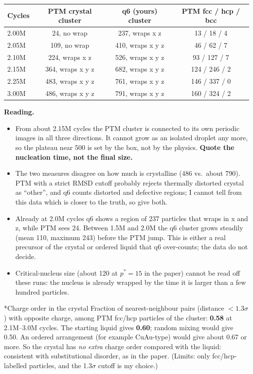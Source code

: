\documentclass[10.5pt,a4paper]{article}
\makeatletter
\renewcommand\subsection{\@startsection{subsection}{2}{0pt}{1.0em plus .2em minus .1em}{0.3em}{\large\bfseries\color{accent}}}
\newcommand{\ps}{p^{*}}
\makeatother
\begin{document}
\begin{center}\small
\begin{tabular}{@{}lccc@{}}
\toprule
Cycles & PTM crystal cluster & q6 (yours) cluster & PTM fcc / hcp / bcc\\
\midrule
2.00M & 24, no wrap & 237, wraps x z & 13 / 18 / 4\\
2.05M & 109, no wrap & 410, wraps x y z & 46 / 62 / 7\\
2.10M & 224, wraps x z & 526, wraps x y z & 93 / 127 / 7\\
2.15M & 364, wraps x y z & 682, wraps x y z & 124 / 246 / 2\\
2.25M & 483, wraps x y z & 761, wraps x y z & 146 / 337 / 0\\
3.00M & 486, wraps x y z & 791, wraps x y z & 160 / 324 / 2\\
\bottomrule
\end{tabular}
\end{center}
\textbf{Reading.}
\begin{itemize}
\item From about 2.15M cycles the PTM cluster is connected to its own periodic images in all three directions. It cannot grow as an isolated droplet any more, so the plateau near 500 is set by the box, not by the physics. \textbf{Quote the nucleation time, not the final size.}
\item The two measures disagree on how much is crystalline (486 vs.\ about 790). PTM with a strict RMSD cutoff probably rejects thermally distorted crystal as ``other'', and q6 counts distorted and defective regions; I cannot tell from this data which is closer to the truth, so give both.
\item Already at 2.0M cycles q6 shows a region of 237 particles that wraps in x and z, while PTM sees 24. Between 1.5M and 2.0M the q6 cluster grows steadily (mean 110, maximum 243) before the PTM jump. This is either a real precursor of the crystal or ordered liquid that q6 over-counts; the data do not decide.
\item Critical-nucleus size (about 120 at $\ps=15$ in the paper) cannot be read off these runs: the nucleus is already wrapped by the time it is larger than a few hundred particles.
\end{itemize}

\subsection*{Charge order in the crystal}
Fraction of nearest-neighbour pairs (distance $<1.3\sigma$) with opposite charge, among PTM fcc/hcp particles of the cluster: \textbf{0.58} at 2.1M--3.0M cycles. The starting liquid gives \textbf{0.60}; random mixing would give 0.50. An ordered arrangement (for example CuAu-type) would give about 0.67 or more. So the crystal has \emph{no extra} charge order compared with the liquid: consistent with substitutional disorder, as in the paper. (Limits: only fcc/hcp-labelled particles, and the 1.3$\sigma$ cutoff is my choice.)
\end{document}
